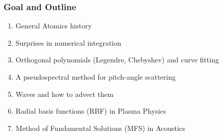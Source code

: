 \begin{frame}
  \frametitle{Goal and Outline}
  
  \begin{center}
  \end{center}

\begin{enumerate}
\item<2-> General Atomics history 
\item<3-> Surprises in numerical integration 
\item<4-> Orthogonal polynomials (Legendre, Chebyshev) and curve fitting
\item<5-> A pseudospectral method for pitch-angle scattering
\item<6-> Waves and how to advect them 
\item<7-> Radial basis functions (RBF) in Plasma Physics
\item<8-> Method of Fundamental Solutions (MFS) in Acoustics
\end{enumerate}
  
\end{frame}
